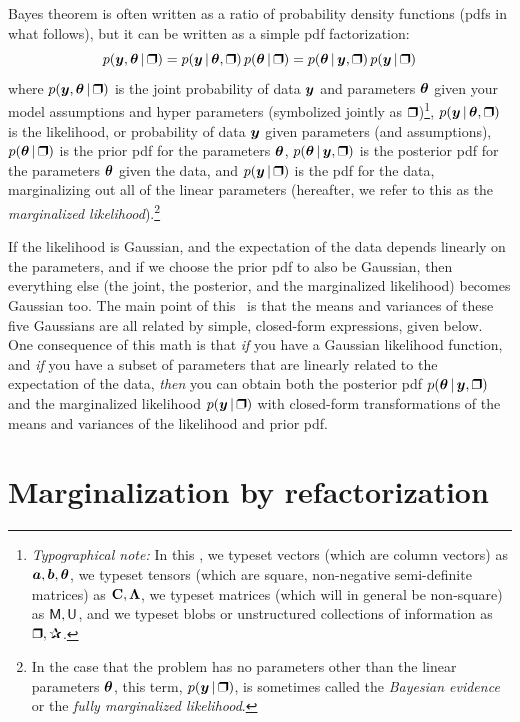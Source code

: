 Bayes theorem is often written as a ratio of probability density
functions (pdfs in what follows), but it can be written as a simple
pdf factorization:
\begin{equation}
p(\vy,\vtheta\given\bH) = p(\vy\given\vtheta,\bH)\,p(\vtheta\given\bH) = p(\vtheta\given\vy,\bH)\,p(\vy\given\bH)
\end{equation}
where
$p(\vy,\vtheta\given\bH)$ is the joint probability of data $\boldsymbol{y}$ and
parameters $\boldsymbol{\theta}$ given your model assumptions and hyper parameters
(symbolized jointly as $\bH$)\footnote{%
\textsl{Typographical note:} In this \documentname, we
typeset vectors (which are column vectors) as $\boldsymbol{a}, \boldsymbol{b}, \boldsymbol{\theta}$, we typeset tensors (which
are square, non-negative semi-definite matrices) as $\mathbf{C}, \mathbf{\Lambda}$,
we typeset matrices (which will in general be non-square) as $\mathsf{M}, \mathsf{U}$,
and we typeset blobs or unstructured
collections of information as $\bH, \bP$.},
$p(\vy\given\vtheta,\bH)$ is the likelihood, or probability of data $\boldsymbol{y}$
given parameters (and assumptions),
$p(\vtheta\given\bH)$ is the prior pdf for the parameters $\boldsymbol{\theta}$,
$p(\vtheta\given\vy,\bH)$ is the posterior pdf for the parameters $\boldsymbol{\theta}$
given the data,
and
$p(\vy\given\bH)$ is the pdf for the data, marginalizing out all of the linear
parameters (hereafter, we refer to this as the \textsl{marginalized
likelihood}).\footnote{In the case that the problem has no parameters other than
the linear parameters $\boldsymbol{\theta}$, this term, $p(\vy \given \bH)$, is sometimes
called the \textsl{Bayesian evidence} or the \textsl{fully marginalized
likelihood}.}

If the likelihood is Gaussian, and the expectation of the data depends linearly
on the parameters, and if we choose the prior pdf to also be Gaussian, then
everything else (the joint, the posterior, and the marginalized likelihood)
becomes Gaussian too.
The main point of this \documentname\ is that the means and variances of these
five Gaussians are all related by simple, closed-form expressions, given below.
One consequence of this math is that \emph{if} you have a Gaussian
likelihood function, and \emph{if} you have a subset of parameters that are
linearly related to the expectation of the data, \emph{then} you can obtain both
the posterior pdf $p(\vtheta\given\vy,\bH)$ and the marginalized likelihood
$p(\vy\given\bH)$ with closed-form transformations of the means and variances of
the likelihood and prior pdf.

\section{Marginalization by refactorization}

